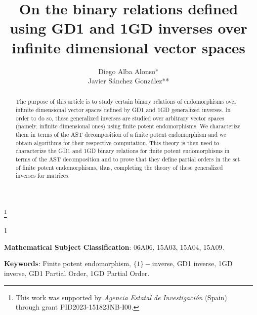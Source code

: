 \documentclass[10pt,a4paper]{amsart}
\theoremstyle{plain}
\theoremstyle{remark}
\numberwithin{equation}{section} \numberwithin{defn}{section}
\begin{document}
\title[On binary relations defined by GD1 and 1GD inverses]{On the binary relations defined using GD1 and 1GD inverses over infinite dimensional vector spaces}
\author{ Diego Alba Alonso* \\Javier Sánchez González**}


\address{Departamento de Matem\'aticas, ETSII, Universidad de Castilla-La Mancha, 13071 Ciudad Real, Spain}


\thanks{This work was supported by {\it Agencia Estatal de Investigación} (Spain) through grant PID2023-151823NB-I00.}


\begin{abstract}
The purpose of this article is to study certain binary relations of endomorphisms over infinite dimensional vector spaces defined by GD1 and 1GD generalized inverses. In order to do so, these generalized inverses are studied over arbitrary vector spaces (namely, infinite dimensional ones) using finite potent endomorphisms. We characterize them in terms of the AST decomposition of a finite potent endomorphism and we obtain algorithms for their respective computation. This theory is then used to characterize the GD1 and 1GD binary relations for finite potent endomorphisms in terms of the AST decomposition and to prove that they define partial orders in the set of finite potent endomorphisms, thus, completing the theory of these generalized inverses for matrices.
\end{abstract}

\maketitle

\bigskip

\setcounter{tocdepth}1

\tableofcontents
\bigskip



\medskip


\textbf{Mathematical Subject Classification}: 06A06, 15A03, 15A04, 15A09.\\ \bigskip 

\textbf{Keywords}: Finite potent endomorphism, $\{1\}-$inverse, GD1 inverse, 1GD inverse, GD1 Partial Order, 1GD Partial Order. 
\end{document}
